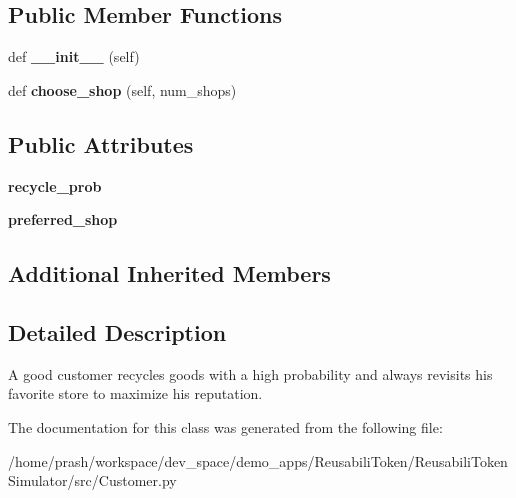 \subsection*{Public Member Functions}
\begin{DoxyCompactItemize}
\item 
\mbox{\label{class_customer_1_1_good_customer_a7b3c3a1b2561f3c5481450861283197c}} 
def {\bfseries \+\_\+\+\_\+init\+\_\+\+\_\+} (self)
\item 
\mbox{\label{class_customer_1_1_good_customer_a016f60237d8510835f7776f262faf30a}} 
def {\bfseries choose\+\_\+shop} (self, num\+\_\+shops)
\end{DoxyCompactItemize}
\subsection*{Public Attributes}
\begin{DoxyCompactItemize}
\item 
\mbox{\label{class_customer_1_1_good_customer_ab81ebccfeb36eb265aa812b49a23815e}} 
{\bfseries recycle\+\_\+prob}
\item 
\mbox{\label{class_customer_1_1_good_customer_af9048444ab878fe7f946229e102b4d4d}} 
{\bfseries preferred\+\_\+shop}
\end{DoxyCompactItemize}
\subsection*{Additional Inherited Members}


\subsection{Detailed Description}
\begin{DoxyVerb}A good customer recycles goods with a high probability and always revisits his favorite store
to maximize his reputation.
\end{DoxyVerb}
 

The documentation for this class was generated from the following file\+:\begin{DoxyCompactItemize}
\item 
/home/prash/workspace/dev\+\_\+space/demo\+\_\+apps/\+Reusabili\+Token/\+Reusabili\+Token\+Simulator/src/Customer.\+py\end{DoxyCompactItemize}
